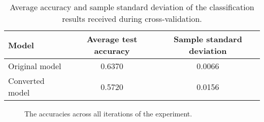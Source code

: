 \begin{table}[htbp]
    \centering
    \begin{tabularx}{\linewidth}{>{\raggedright\arraybackslash}Xcc}
    \toprule
        Model & Average test accuracy & Sample standard deviation \\
    \midrule
        Original model & 0.6370 & 0.0066 \\
        Converted model & 0.5720 & 0.0156 \\
    \bottomrule
    \end{tabularx}
    \caption{Average accuracy and sample standard deviation of the classification results received during cross-validation.}
    \label{tab:GTN_results}
\end{table}

\begin{figure}[htbp]
    \centering
    
    \caption{The accuracies across all iterations of the experiment.}
    \label{fig:GTN_graph}
\end{figure}






